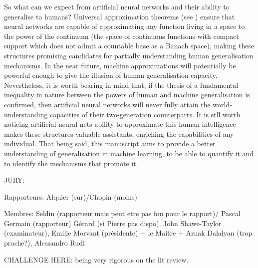 So what can we expect from artificial neural networks and their ability to generalise to humans? Universal approximation theorems (see \eg \citealp{lu2017expressive,park2021minimum}) ensure that neural networks are capable of approximating any function living in a space to the power of the continuum (\eg the space of continuous functions with compact support which does not admit a countable base as a Banach space), making these structures promising candidates for partially understanding human generalisation mechanisms.
In the near future, machine approximations will potentially be powerful enough to give the illusion of human generalisation capacity. Nevertheless, it is worth bearing in mind that, if the thesis of a fundamental inequality in nature between the powers of human and machine generalisation is confirmed, then artificial neural networks will never fully attain the world-understanding capacities of their two-generation counterparts. It is stll worth noticing artificial neural nets ability to approximate this human intelligence makes these structures valuable assistants, enriching the capabilities of any individual. That being said, this manuscript aims to provide a better understanding of generalisation in machine learning, to be able to quantify it and to identify the mechanisms that promote it.







JURY: 


Rapporteurs: Alquier (sur)/Chopin (moins)

Membres: Seldin (rapporteur mais peut etre pas fou pour le rapport)/ Pascal Germain (rapporteur) Gérard (si Pierre pas dispo), John Shawe-Taylor (examinateur), Emilie Morvant (présidente) + le Maitre + Arnak Dalalyan (trop proche?), Alessandro Rudi
 


CHALLENGE HERE: being very rigorous on the lit review.
\newpage